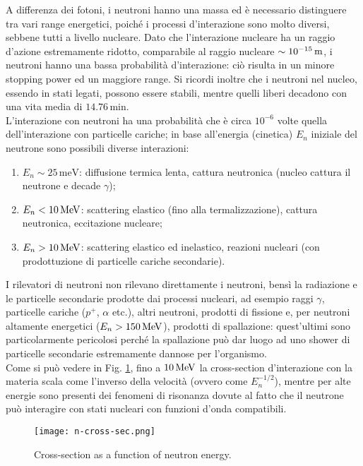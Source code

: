 A differenza dei fotoni, i neutroni hanno una massa ed è necessario distinguere tra vari range energetici, poiché i processi d'interazione sono molto diversi, sebbene tutti a livello nucleare. Dato che l'interazione nucleare ha un raggio d'azione estremamente ridotto, comparabile al raggio nucleare $ \sim 10^{-15} \,\mathrm{m} $, i neutroni hanno una bassa probabilità d'interazione: ciò risulta in un minore stopping power ed un maggiore range. Si ricordi inoltre che i neutroni nel nucleo, essendo in stati legati, possono essere stabili, mentre quelli liberi decadono con una vita media di $ 14.76\,\text{min} $.\\
L'interazione con neutroni ha una probabilità che è circa $ 10^{-6} $ volte quella dell'interazione con particelle cariche; in base all'energia (cinetica) $ E_n $ iniziale del neutrone sono possibili diverse interazioni:
\begin{enumerate}
	\item $ E_n \sim 25 \,\text{meV} $: diffusione termica lenta, cattura neutronica (nucleo cattura il neutrone e decade $ \gamma $);
	\item $ E_n < 10 \,\mathrm{MeV} $: scattering elastico (fino alla termalizzazione), cattura neutronica, eccitazione nucleare;
	\item $ E_n > 10 \,\mathrm{MeV} $: scattering elastico ed inelastico, reazioni nucleari (con prodottuzione di particelle cariche secondarie).
\end{enumerate}
I rilevatori di neutroni non rilevano direttamente i neutroni, bensì la radiazione e le particelle secondarie prodotte dai processi nucleari, ad esempio raggi $ \gamma $, particelle cariche ($ p^+ $, $ \alpha $ etc.), altri neutroni, prodotti di fissione e, per neutroni altamente energetici ($ E_n > 150\,\mathrm{MeV} $), prodotti di spallazione: quest'ultimi sono particolarmente pericolosi perché la spallazione può dar luogo ad uno shower di particelle secondarie estremamente dannose per l'organismo.\\
Come si può vedere in Fig. \ref{n-cross-sec}, fino a $ 10\,\mathrm{MeV} $ la cross-section d'interazione con la materia scala come l'inverso della velocità (ovvero come $ E_n^{-1/2} $), mentre per alte energie sono presenti dei fenomeni di risonanza dovute al fatto che il neutrone può interagire con stati nucleari con funzioni d'onda compatibili.

\begin{figure}[!t]
	\centering
	\texttt{[image: n-cross-sec.png]}
	\caption{Cross-section as a function of neutron energy.}
	\label{n-cross-sec}
\end{figure}

